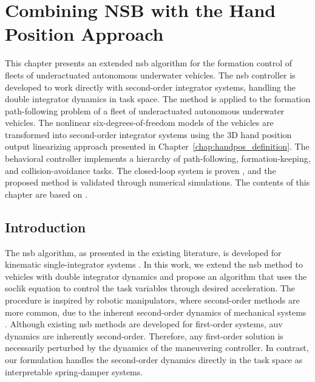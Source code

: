 \chapter{Combining NSB with the Hand Position Approach}
\label{chap:handpos_NSB}

This chapter presents an extended \acrfull{nsb} algorithm for the formation control of fleets of underactuated autonomous underwater vehicles. 
The \gls{nsb} controller is developed to work directly with second-order integrator systems, handling the double integrator dynamics in task space. 
The method is applied to the formation path-following problem of a fleet of underactuated autonomous underwater vehicles. 
The nonlinear six-degrees-of-freedom models of the vehicles are transformed into second-order integrator systems using the 3D hand position output linearizing approach presented in Chapter~\ref{chap:handpos_definition}. 
The behavioral controller implements a hierarchy of path-following, formation-keeping, and collision-avoidance tasks.
The closed-loop system is proven , and the proposed method is validated through numerical simulations.
The contents of this chapter are based on \cite{lie_formation_2023}.

\section{Introduction}

The \gls{nsb} algorithm, as presented in the existing literature, is developed for kinematic single-integrator systems \cite{arrichiello_formation_2006, matous_singularity-free_2022, eek_formation_2021}. In this work, we extend the \gls{nsb} method to vehicles with double integrator dynamics and propose an algorithm that uses the \acrlong{soclik} equation to control the task variables through desired acceleration. The procedure is inspired by robotic manipulators, where second-order methods are more common,  due to the inherent second-order dynamics of mechanical systems \cite{siciliano_differential_2009, chiaverini_kinematically_2008}. Although existing \gls{nsb} methods are developed for first-order systems, \gls{auv} dynamics are inherently second-order. Therefore, any first-order solution is necessarily perturbed by the dynamics of the maneuvering controller. In contrast, our formulation handles the second-order dynamics directly in the task space as interpretable spring-damper systems.

